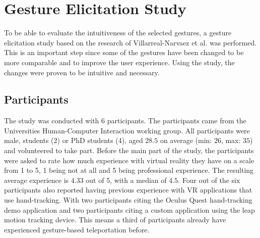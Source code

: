 
\chapter{Gesture Elicitation Study}
To be able to evaluate the intuitiveness of the selected gestures, a gesture elicitation study based on the research of Villarreal-Narvaez et al. \cite{elicitation} was performed. This is an important step since some of the gestures have been changed to be more comparable and to improve the user experience. Using the study, the changes were proven to be intuitive and necessary. 


\section{Participants}
The study was conducted with 6 participants. The participants came from the Universities Human-Computer Interaction working group. All participants were male, students (2) or PhD students (4), aged $28.5$ on average (min: $26$, max: $35$) and volunteered to take part. Before the main part of the study, the participants were asked to rate how much experience with virtual reality they have on a scale from 1 to 5, 1 being not at all and 5 being professional experience. The resulting average experience is $4.33$ out of 5, with a median of $4.5$. Four out of the six participants also reported having previous experience with VR applications that use hand-tracking. With two participants citing the Oculus Quest hand-tracking demo application and two participants citing a custom application using the leap motion tracking device. %
This means a third of participants already have experienced gesture-based teleportation before. 


